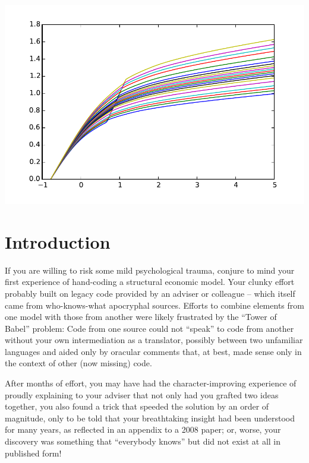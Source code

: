 \documentclass[12pt,titlepage,letterpaper]{econtex}
\begin{document}
{\begin{center}
\includegraphics[scale=0.8]{UserGuidePic.pdf}
\end{center}

\thispagestyle{empty}
\newpage

\tableofcontents

\newpage

\section{Introduction}\label{sec:Introduction}

If you are willing to risk some mild psychological trauma, conjure to mind your first experience of hand-coding a structural economic model.  Your clunky effort probably built on legacy code provided by an adviser or colleague -- which itself came from who-knows-what apocryphal sources.  Efforts to combine elements from one model with those from another were likely frustrated by the ``Tower of Babel'' problem: Code from one source could not ``speak'' to code from another without your own intermediation as a translator, possibly between two unfamiliar languages and aided only by oracular comments that, at best, made sense only in the context of other (now missing) code.

After months of effort, you may have had the character-improving experience of proudly explaining to your adviser that not only had you grafted two ideas together, you also found a trick that speeded the solution by an order of magnitude, only to be told that your breathtaking insight had been understood for many years, as reflected in an appendix to a 2008 paper; or, worse, your discovery was something that ``everybody knows'' but did not exist at all in published form!

}
\end{document}
